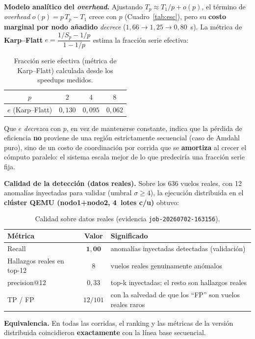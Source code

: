 \documentclass[letterpaper,11pt]{article}
\begin{document}
\textbf{Modelo analítico del \emph{overhead}.} Ajustando $T_p \approx T_1/p + o(p)$, el término de
\emph{overhead} $o(p)=p\,T_p-T_1$ crece con $p$ (Cuadro~\ref{tab:esc}), pero su \textbf{costo marginal por
nodo añadido} \emph{decrece} ($1{,}66 \to 1{,}25 \to 0{,}80$~s). La métrica de \textbf{Karp--Flatt}
$e=\dfrac{1/S_p-1/p}{1-1/p}$ estima la fracción serie efectiva:

\begin{table}[H]\centering\small
\caption{Fracción serie efectiva (métrica de Karp--Flatt) calculada desde los speedups medidos.}
\label{tab:kf}
\begin{tabular}{cccc}
\toprule
$p$ & $2$ & $4$ & $8$ \\
\midrule
$e$ (Karp--Flatt) & $0{,}130$ & $0{,}095$ & $0{,}062$ \\
\bottomrule
\end{tabular}
\end{table}

Que $e$ \emph{decrezca} con $p$, en vez de mantenerse constante, indica que la pérdida de eficiencia
\textbf{no} proviene de una región estrictamente secuencial (caso de Amdahl puro), sino de un costo de
coordinación por corrida que se \textbf{amortiza} al crecer el cómputo paralelo: el sistema escala mejor
de lo que predeciría una fracción serie fija.

\textbf{Calidad de la detección (datos reales).} Sobre los 636 vuelos reales, con 12 anomalías inyectadas
para validar (umbral $\sigma\ge 4$), la ejecución distribuida en el \textbf{clúster QEMU (nodo1+nodo2,
4~lotes c/u)} obtuvo:

\begin{table}[H]\centering
\caption{Calidad sobre datos reales (evidencia \texttt{job-20260702-163156}).}
\begin{tabular}{lcl}
\toprule
Métrica & Valor & Significado \\
\midrule
Recall & $\mathbf{1{,}00}$ & anomalías inyectadas detectadas (validación) \\
Hallazgos reales en top-12 & $8$ & vuelos reales genuinamente anómalos \\
precision@12 & $0{,}33$ & top-k inyectadas; el resto son hallazgos reales \\
TP / FP & $12 / 101$ & con la salvedad de que los ``FP'' son vuelos reales raros \\
\bottomrule
\end{tabular}
\end{table}

\textbf{Equivalencia.} En todas las corridas, el ranking y las métricas de la versión distribuida
coincidieron \textbf{exactamente} con la línea base secuencial.
\end{document}
